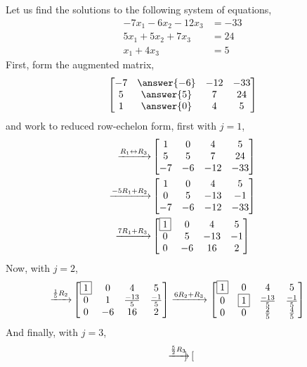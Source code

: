 \documentclass{ximera}
\begin{document}
\begin{example}
Let us find the solutions to the following system of equations,
\begin{align*}
-7x_1 -6 x_2 - 12x_3 &=-33\\
 5x_1  + 5x_2 + 7x_3 &=24\\
 x_1 +4x_3 &=5
\end{align*}
First, form the augmented matrix,
\[
\begin{bmatrix}
-7&\answer{-6}&- 12&-33\\
 5&\answer{5}&7&24\\
 1&\answer{0}&4&5
\end{bmatrix}
\]
and work to reduced row-echelon form, first with $j=1$,
\begin{align*}
\xrightarrow{R_{1}\leftrightarrow R_{3}}
&
\begin{bmatrix}
1&0&4&5\\
5&5&7&24\\
-7&-6&-12&-33
\end{bmatrix} \\
\xrightarrow{-5R_{1}+R_{2}}
& \begin{bmatrix}
1&0&4&5\\
0&5&-13&-1\\
-7&-6&-12&-33
\end{bmatrix}\\
\xrightarrow{7R_{1}+R_{3}}
&
\begin{bmatrix}
\fbox{1}&0&4&5\\
0&5&-13&-1\\
0&-6&16&2
\end{bmatrix}
\end{align*}
Now, with $j=2$,
\begin{align*}
\xrightarrow{\frac{1}{5}R_{2}}
&
\begin{bmatrix}
\fbox{1}&0&4&5\\
0&1&\frac{-13}{5}&\frac{-1}{5}\\
0&-6&16&2
\end{bmatrix}
\xrightarrow{6R_{2}+R_{3}}
\begin{bmatrix}
\fbox{1}&0&4&5\\
0&\fbox{1}&\frac{-13}{5}&\frac{-1}{5}\\
0&0&\frac{2}{5}&\frac{4}{5}
\end{bmatrix}
\end{align*}
And finally, with $j=3$,
\begin{align*}
\xrightarrow{\frac{5}{2}R_{3}}
&
\begin{bmatrix}

\end{bmatrix}
\end{align*}
\end{example}
\end{document}
